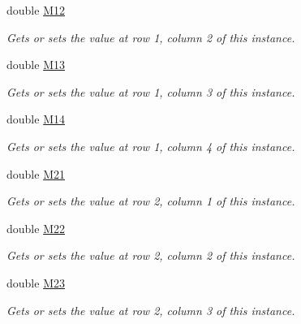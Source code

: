 \begin{DoxyCompactItemize}
double \hyperlink{struct_open_t_k_1_1_matrix3x4d_a838b2ce61898d2b5e5b1397ea63b0c1a}{M12}
\begin{DoxyCompactList}\small\item\em Gets or sets the value at row 1, column 2 of this instance. \end{DoxyCompactList}\item 
double \hyperlink{struct_open_t_k_1_1_matrix3x4d_a4898ead8e9a56643186dcffea709412c}{M13}
\begin{DoxyCompactList}\small\item\em Gets or sets the value at row 1, column 3 of this instance. \end{DoxyCompactList}\item 
double \hyperlink{struct_open_t_k_1_1_matrix3x4d_afd9339e45cf4ca9f844f9eaf02135312}{M14}
\begin{DoxyCompactList}\small\item\em Gets or sets the value at row 1, column 4 of this instance. \end{DoxyCompactList}\item 
double \hyperlink{struct_open_t_k_1_1_matrix3x4d_a2ac0d9448c02b9f7165b5bcbc22d1f89}{M21}
\begin{DoxyCompactList}\small\item\em Gets or sets the value at row 2, column 1 of this instance. \end{DoxyCompactList}\item 
double \hyperlink{struct_open_t_k_1_1_matrix3x4d_afa4dfc45ebcff46af39e7e12b472bb0a}{M22}
\begin{DoxyCompactList}\small\item\em Gets or sets the value at row 2, column 2 of this instance. \end{DoxyCompactList}\item 
double \hyperlink{struct_open_t_k_1_1_matrix3x4d_a281132f3d09808b92bd08670aae6ad44}{M23}
\begin{DoxyCompactList}\small\item\em Gets or sets the value at row 2, column 3 of this instance. \end{DoxyCompactList}\item 

\end{DoxyCompactItemize}
